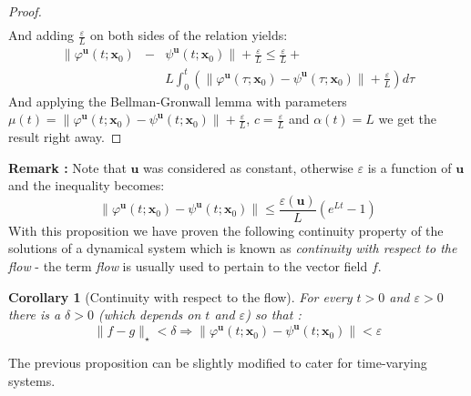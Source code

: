 \documentclass[a4paper,10pt,oneside]{book}
\newtheorem{corollary}[theorem]{Corollary}
\begin{document}
\begin{proof}
\begin{eqnarray}
\end{eqnarray}
And adding $\frac{\varepsilon}{L}$ on both sides of the relation yields:
\begin{eqnarray}
\|\varphi^{\mathbf{u}}(t;\mathbf{x}_0)&-&\psi^{\mathbf{u}}(t;\mathbf{x}_0)\|+\frac{\varepsilon}{L} \leq\frac{\varepsilon}{L}+\nonumber\\
 &&L\int_0^t \left(\|\varphi^{\mathbf{u}}(\tau;\mathbf{x}_0)-\psi^{\mathbf{u}}(\tau;\mathbf{x}_0)\|+\frac{\varepsilon}{L}\right) d\tau
\end{eqnarray}
And applying the Bellman-Gronwall lemma with parameters $\mu(t)=\|\varphi^{\mathbf{u}}(t;\mathbf{x}_0)-\psi^{\mathbf{u}}(t;\mathbf{x}_0)\|+\frac{\varepsilon}{L}$, $c=\frac{\varepsilon}{L}$ and $\alpha(t)=L$ we get the result right away.
\end{proof}
\noindent \textbf{Remark : } Note that $\mathbf{u}$ was considered as constant, otherwise $\varepsilon$ is a function of $\mathbf{u}$ and the inequality becomes:
\begin{equation}
 \|\varphi^{\mathbf{u}}(t;\mathbf{x}_0)-\psi^{\mathbf{u}}(t;\mathbf{x}_0)\|\leq\frac{\varepsilon(\mathbf{u})}{L}(e^{Lt}-1)
\end{equation}
With this proposition we have proven the following continuity property of the solutions of a dynamical system which is known as  \emph{continuity with respect to the flow} - the term \emph{flow } is usually used to pertain to the vector field $f$.
\begin{corollary}[Continuity with respect to the flow]
 For every $t>0$ and $\varepsilon>0$ there is a $\delta>0$ (which depends on $t$ and $\varepsilon$) so that :
\begin{equation}
 \|f-g\|_\star < \delta \Rightarrow \|\varphi^{\mathbf{u}}(t;\mathbf{x}_0)-\psi^{\mathbf{u}}(t;\mathbf{x}_0)\|<\varepsilon
\end{equation}
\end{corollary}
\noindent The previous proposition can be slightly modified to cater for time-varying systems.
\end{document}
